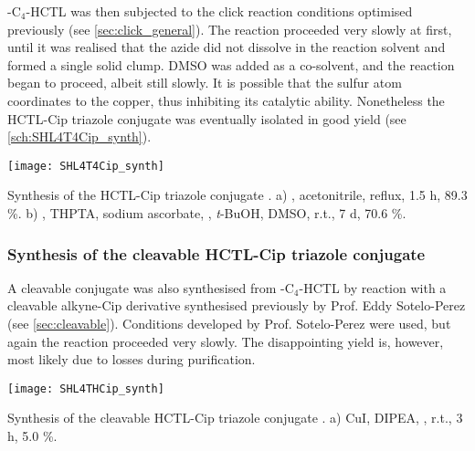 -C$_4$-HCTL  was then subjected to the click reaction conditions optimised previously (see \ref{sec:click_general}). The reaction proceeded very slowly at first, until it was realised that the azide did not dissolve in the reaction solvent and formed a single solid clump. DMSO was added as a co-solvent, and the reaction began to proceed, albeit still slowly. It is possible that the sulfur atom coordinates to the copper, thus inhibiting its catalytic ability. Nonetheless the HCTL-Cip triazole conjugate  was eventually isolated in good yield (see \ref{sch:SHL4T4Cip_synth}).

\begin{scheme}[H]
	\begin{center}
		\texttt{[image: SHL4T4Cip\_synth]}
		\caption{
			Synthesis of the HCTL-Cip triazole conjugate .
			a) , acetonitrile, reflux, 1.5 h, 89.3 \%.
			b) , THPTA, sodium ascorbate, , \textit{t}-BuOH, DMSO, r.t., 7 d, 70.6 \%.
			\label{sch:SHL4T4Cip_synth}}
	\end{center}
\end{scheme}

\subsubsection{Synthesis of the cleavable HCTL-Cip triazole conjugate }

A cleavable conjugate  was also synthesised from -C$_4$-HCTL  by reaction with a cleavable alkyne-Cip derivative  synthesised previously by Prof. Eddy Sotelo-Perez (see \ref{sec:cleavable}). Conditions developed by Prof. Sotelo-Perez were used, but again the reaction proceeded very slowly. The disappointing yield is, however, most likely due to losses during purification.

\begin{scheme}[H]
	\begin{center}
		\texttt{[image: SHL4THCip\_synth]}
		\caption{
			Synthesis of the cleavable HCTL-Cip triazole conjugate .
			a) CuI, DIPEA, , r.t., 3 h, 5.0 \%.
			\label{sch:SHL4THCip_synth}}
	\end{center}
\end{scheme}